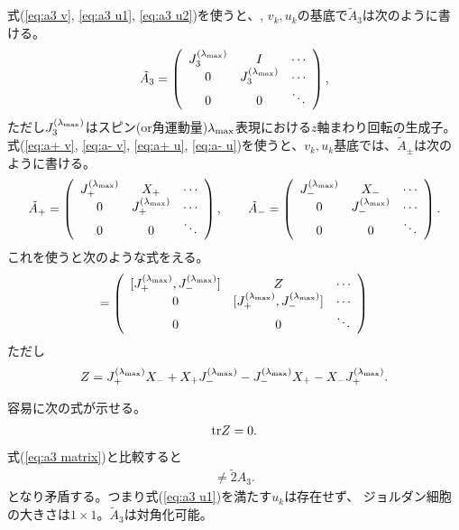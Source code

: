 \documentclass[10pt,a4paper]{jarticle}
\begin{document}
式(\ref{eq:a3 v}, \ref{eq:a3 u1}, \ref{eq:a3 u2})を使うと、, $v_k, u_k$の基底で$\tilde A_3$は次のように書ける。
\begin{align}
\tilde A_3 = \left(\begin{array}{ccc}
J_3^{(\lambda_{\rm max})} & I & \cdots \\
0 & J_3^{(\lambda_{\rm max})} & \cdots \\
0 & 0 & \ddots
\end{array}\right), \label{eq:a3 matrix}
\end{align}
ただし$J_3^{(\lambda_{\rm max})}$はスピン(or角運動量)$\lambda_{\rm max}$表現における$z$軸まわり回転の生成子。
%
式(\ref{eq:a+ v}, \ref{eq:a- v}, \ref{eq:a+ u}, \ref{eq:a- u})を使うと、$v_k, u_k$基底では、$\tilde A_\pm$は次のように書ける。
\begin{align}
\tilde A_+ = \left(\begin{array}{ccc}
J_+^{(\lambda_{\rm max})} & X_+ & \cdots \\
0 & J_+^{(\lambda_{\rm max})} & \cdots \\
0 & 0 & \ddots
\end{array}\right), \qquad
\tilde A_- = \left(\begin{array}{ccc}
J_-^{(\lambda_{\rm max})} & X_- & \cdots \\
0 & J_-^{(\lambda_{\rm max})} & \cdots \\
0 & 0 & \ddots
\end{array}\right).
\end{align}
%
これを使うと次のような式をえる。
\begin{align}
[\tilde A_+, \tilde A_-]
=
\left(\begin{array}{ccc}
[J_+^{(\lambda_{\rm max})}, J_-^{(\lambda_{\rm max})}] & Z & \cdots \\
0 & [J_+^{(\lambda_{\rm max})}, J_-^{(\lambda_{\rm max})}] & \cdots \\
0 & 0 & \ddots
\end{array}\right)
\end{align}
ただし
\begin{align}
Z = J_+^{(\lambda_{\rm max})} X_- + X_+ J_-^{(\lambda_{\rm max})} - J_-^{(\lambda_{\rm max})} X_+ - X_- J_+^{(\lambda_{\rm max})}.
\end{align}

容易に次の式が示せる。
\begin{align}
{\rm tr}Z = 0.
\end{align}
式(\ref{eq:a3 matrix})と比較すると
\begin{align}
[\tilde A_+, \tilde A_-] \neq \tilde 2 A_3.
\end{align}
となり矛盾する。つまり式(\ref{eq:a3 u1})を満たす$u_k$は存在せず、
ジョルダン細胞の大きさは$1\times 1$。$\tilde A_3$は対角化可能。
\end{document}
